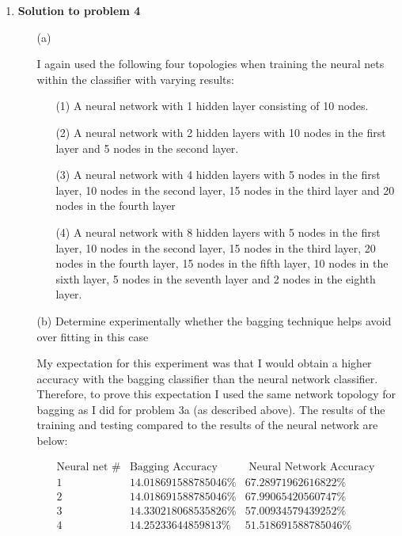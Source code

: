 \begin{enumerate}

	\item {\bf Solution to problem 4}
	
		\begin{enumerate}
		
			\item[(a)] 
			
			I again used the following four topologies when training the neural nets within the classifier with varying results:
			
				\begin{enumerate}
				
					\item[(1)] A neural network with 1 hidden layer consisting of 10 nodes.
				
					\item[(2)] A neural network with 2 hidden layers with 10 nodes in the first layer and 5 nodes in the second layer.
				
					\item[(3)] A neural network with 4 hidden layers with 5 nodes in the first layer, 10 nodes in the second layer, 15 nodes in the third layer and 20 nodes in the fourth layer
				
					\item[(4)] A neural network with 8 hidden layers with 5 nodes in the first layer, 10 nodes in the second layer, 15 nodes in the third layer, 20 nodes in the fourth layer, 15 nodes in the fifth layer, 10 nodes in the sixth layer, 5 nodes in the seventh layer and 2 nodes in the eighth layer.
				
				\end{enumerate}
							
			\item[(b)] Determine experimentally whether the bagging technique helps avoid over fitting in this case
			
				My expectation for this experiment was that I would obtain a higher accuracy with the bagging classifier than the neural network classifier.  Therefore, to prove this expectation I used the same network topology for bagging as I did for problem 3a (as described above).  The results of the training and testing compared to the results of the neural network are below:
				
				\[
					\begin{array}{c|cc}
						\text{Neural net \#} & \text{Bagging Accuracy} & \text{ Neural Network Accuracy } \\
						\hline
						1 & 14.018691588785046\% & 67.28971962616822\% \\
						2 & 14.018691588785046\% & 67.99065420560747\% \\
						3 & 14.330218068535826\% & 57.00934579439252\% \\
						4 & 14.25233644859813\% & 51.518691588785046\% \\
					\end{array}
				\]
				

\end{enumerate}
\end{enumerate}
